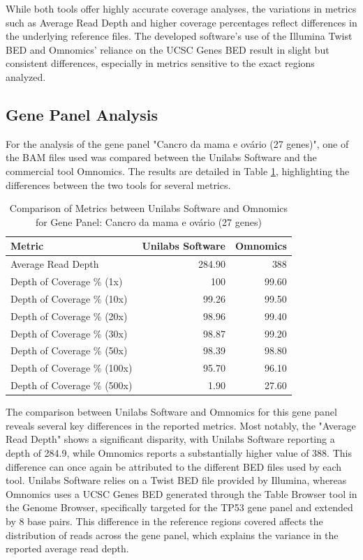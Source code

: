 While both tools offer highly accurate coverage analyses, the variations in metrics such as Average Read Depth and higher coverage percentages reflect differences in the underlying reference files. The developed software's use of the Illumina Twist BED and Omnomics' reliance on the UCSC Genes BED result in slight but consistent differences, especially in metrics sensitive to the exact regions analyzed.

\subsection{Gene Panel Analysis}

For the analysis of the gene panel "Cancro da mama e ovário (27 genes)", one of the BAM files used was compared between the Unilabs Software and the commercial tool Omnomics. The results are detailed in Table \ref{tab:panel_omnomicsVSunilabs}, highlighting the differences between the two tools for several metrics.

\begin{table}[]
\centering
\caption{Comparison of Metrics between Unilabs Software and Omnomics for Gene Panel: Cancro da mama e ovário (27 genes)}
\label{tab:panel_omnomicsVSunilabs}
\begin{tabular}{lrr}
\textbf{Metric}                      & \textbf{Unilabs Software} & \textbf{Omnomics} \\ \hline
Average Read Depth          & 284.90           & 388      \\
Depth of Coverage \% (1x)   & 100              & 99.60     \\
Depth of Coverage \% (10x)  & 99.26            & 99.50     \\
Depth of Coverage \% (20x)  & 98.96            & 99.40     \\
Depth of Coverage \% (30x)  & 98.87            & 99.20     \\
Depth of Coverage \% (50x)  & 98.39            & 98.80     \\
Depth of Coverage \% (100x) & 95.70            & 96.10     \\
Depth of Coverage \% (500x) & 1.90             & 27.60    
\end{tabular}
\end{table}

The comparison between Unilabs Software and Omnomics for this gene panel reveals several key differences in the reported metrics. Most notably, the "Average Read Depth" shows a significant disparity, with Unilabs Software reporting a depth of 284.9, while Omnomics reports a substantially higher value of 388. This difference can once again be attributed to the different BED files used by each tool. Unilabs Software relies on a Twist BED file provided by Illumina, whereas Omnomics uses a UCSC Genes BED generated through the Table Browser tool in the Genome Browser, specifically targeted for the TP53 gene panel and extended by 8 base pairs. This difference in the reference regions covered affects the distribution of reads across the gene panel, which explains the variance in the reported average read depth.

